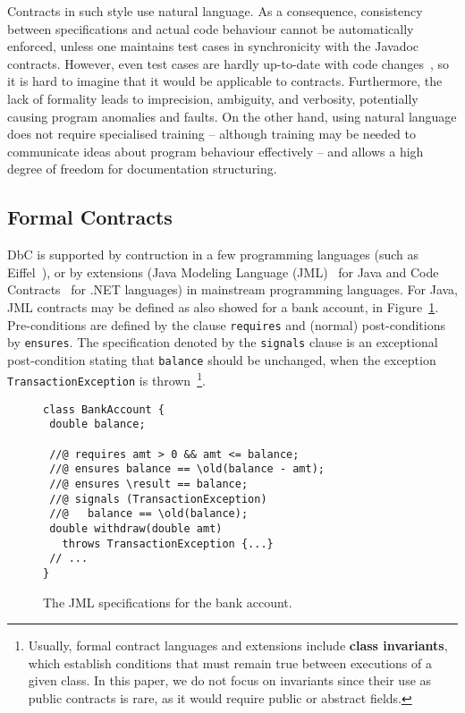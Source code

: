 Contracts in such style use natural language. As a consequence, consistency between specifications and actual code behaviour cannot be automatically enforced, unless one maintains test cases in synchronicity with the Javadoc contracts. However, even test cases are hardly up-to-date with code changes~\cite{Hao2013}, so it is hard to imagine that it would be applicable to contracts. 
Furthermore, the lack of formality leads to imprecision, ambiguity, and verbosity, potentially causing program anomalies and faults.
On the other hand, using natural language does not require specialised training -- although training may be needed to communicate
ideas about program behaviour effectively -- and allows a high degree of freedom for documentation structuring. 


\subsection{Formal Contracts}


DbC is supported by contruction in a few programming languages (such as Eiffel~\cite{eiffel}), or by extensions (Java Modeling Language (JML)~\cite{jml} for Java and Code Contracts~\cite{codeContractsPaper} for .NET languages) in mainstream programming languages.
For Java, JML contracts may be defined as also showed for a bank account, in Figure~\ref{Fig-JML-Bank}. Pre-conditions
are defined by the clause {\lstinline!requires!} and (normal) post-conditions by {\lstinline!ensures!}. The specification
denoted by the {\lstinline!signals!} clause
is an exceptional post-condition stating that {\lstinline!balance!} should be unchanged, when the exception \texttt{TransactionExcep\-tion} is thrown~\footnote{Usually, formal contract languages and extensions include \textbf{class invariants}, which establish conditions that must remain true between executions of a given class. In this paper, we do not focus on invariants since their use as public contracts is rare, as it would require public or abstract fields.}.

\begin{figure}
\begin{lstlisting}[basicstyle=\footnotesize\ttfamily,name=figxpi]
class BankAccount {
 double balance;

 //@ requires amt > 0 && amt <= balance;
 //@ ensures balance == \old(balance - amt);
 //@ ensures \result == balance;
 //@ signals (TransactionException) 
 //@   balance == \old(balance);
 double withdraw(double amt) 
   throws TransactionException {...}
 // ...
}
\end{lstlisting}
\caption{The JML specifications for the bank account.}
\label{Fig-JML-Bank}
\end{figure}

